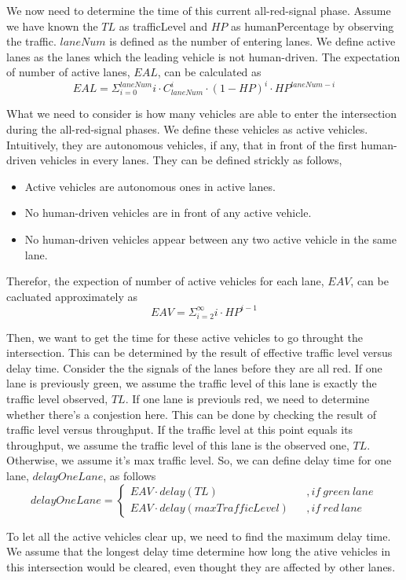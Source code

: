 \documentclass[11pt]{article}
\begin{document}
We now need to determine the time of this current all-red-signal phase. Assume we have known the $TL$ as trafficLevel and $HP$ as humanPercentage by observing the traffic. $laneNum$ is defined as the number of entering lanes. We define active lanes as the lanes which the leading vehicle is not human-driven. The expectation of number of active lanes, $EAL$, can be calculated as
\begin{equation}
EAL=\Sigma_{i=0}^{laneNum} i\cdot C_{laneNum}^i\cdot (1-HP)^i \cdot HP^{laneNum-i}
\end{equation}

What we need to consider is how many vehicles are able to enter the intersection during the all-red-signal phases. We define these vehicles as active vehicles. Intuitively, they are autonomous vehicles, if any, that in front of the first human-driven vehicles in every lanes. They can be defined strickly as follows,
\begin{itemize}
\item Active vehicles are autonomous ones in active lanes.
\item No human-driven vehicles are in front of any active vehicle.
\item No human-driven vehicles appear between any two active vehicle in the same lane.
\end{itemize}
Therefor, the expection of number of active vehicles for each lane, $EAV$, can be cacluated approximately as
\begin{equation}
EAV=\Sigma_{i=2}^\infty i \cdot HP^{i-1}
\end{equation}

Then, we want to get the time for these active vehicles to go throught the intersection. This can be determined by the result of effective traffic level versus delay time. Consider the the signals of the lanes before they are all red. If one lane is previously green, we assume the traffic level of this lane is exactly the traffic level observed, $TL$. If one lane is previouls red, we need to determine whether there's a conjestion here. This can be done by checking the result of traffic level versus throughput. If the traffic level at this point equals its throughput, we assume the traffic level of this lane is the observed one, $TL$. Otherwise, we assume it's max traffic level. So, we can define delay time for one lane, $delayOneLane$, as follows
\begin{equation}
delayOneLane=\left\{
\begin{array}{lcl}
EAV \cdot delay(TL) && {,if\ green\ lane}\\
EAV \cdot delay(maxTrafficLevel) && {,if\ red\ lane}
\end{array} \right.
\end{equation}

To let all the active vehicles clear up, we need to find the maximum delay time. We assume that the longest delay time determine how long the ative vehicles in this intersection would be cleared, even thought they are affected by other lanes.
\end{document}
